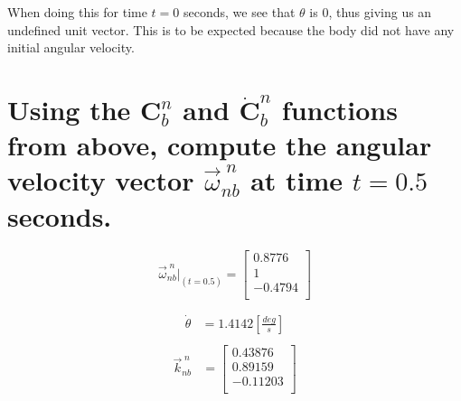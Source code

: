 \documentclass[12pt,letterpaper, onecolumn]{exam}
\begin{document}
\begin{questions}
\begin{parts}
\begin{subparts}
{                When doing this for time $t = 0$ seconds, we see that $\theta$ is 0, thus giving us an undefined unit vector. This is to be expected because the body did not have any initial angular velocity.
            }
        \end{subparts}

        \part{Using the $\mathbf{C}^n_b$ and $\dot{\mathbf{C}}^n_b$ functions from above, compute the angular velocity vector $\vec{\omega}^{\;n}_{nb}$ at time $t = 0.5$ seconds.}
        \[\vec{\omega}^{\;n}_{nb}\vert_{(t = 0.5)}  =
            \begin{bmatrix}
                0.8776  \\
                1       \\
                -0.4794 \\
            \end{bmatrix} \]
        \begin{subparts}
            \begin{equation}
                \begin{split}
                    \dot{\theta} & = 1.4142\left[\frac{deg}{s}\right] \\
                \end{split}
            \end{equation}
            \begin{equation}
                \begin{split}
                    \vec{k}^{\;n}_{nb} & =
                    \begin{bmatrix}
                        0.43876        \\
                        0.89159        \\
                        -      0.11203 \\
                    \end{bmatrix}
                \end{split}
            \end{equation}
        \end{subparts}

\end{parts}
\end{questions}
\end{document}
